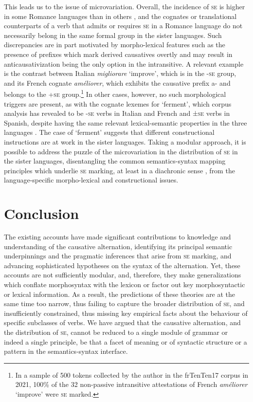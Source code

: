 \documentclass[output=paper,colorlinks,citecolor=brown
]{langscibook}
\begin{document}
This leads us to the issue of microvariation. Overall, the incidence of \textsc{se} is higher in some Romance languages than in others \citep{heidinger2015causalness}, and the cognates or translational counterparts of a verb that admits or requires \textsc{se} in a Romance language do not necessarily belong in the same formal group in the sister languages. Such discrepancies are in part motivated by morpho-lexical features such as the presence of prefixes which mark derived causatives overtly and may result in anticausativization being the only option in the intransitive. A relevant example is the contrast between Italian \textit{migliorare} ‘improve’, which is in the -\textsc{se} group, and its French cognate \textit{améliorer}, which exhibits the causative prefix a- and belongs to the +\textsc{se} group.\footnote{In a sample of 500 tokens collected by the author in the frTenTen17 corpus \citep{jakubicek2013tenten} in 2021, 100\% of the 32 non-passive intransitive attestations of French \textit{améliorer} ‘improve’ were \textsc{se} marked.}  In other cases, however, no such morphological triggers are present, as with the cognate lexemes for ‘ferment’, which corpus analysis has revealed to be -\textsc{se} verbs in Italian and French and ±\textsc{se} verbs in Spanish, despite having the same relevant lexical-semantic properties in the three languages \citep{bentley2023internally}. The case of ‘ferment’ suggests that different constructional instructions are at work in the sister languages. Taking a modular approach, it is possible to address the puzzle of the microvariation in the distribution of \textsc{se} in the sister languages, disentangling the common semantics-syntax mapping principles which underlie \textsc{se} marking, at least in a diachronic sense \citep{cennamo1995patterns}, from the language-specific morpho-lexical and constructional issues. 

\section{Conclusion}
\label{bentley_section_6}
The existing accounts have made significant contributions to knowledge and understanding of the causative alternation, identifying its principal semantic underpinnings and the pragmatic inferences that arise from \textsc{se} marking, and advancing sophisticated hypotheses on the syntax of the alternation. Yet, these accounts are not sufficiently modular, and, therefore, they make generalizations which conflate morphosyntax with the lexicon or factor out key morphosyntactic or lexical information.  As a result, the predictions of these theories are at the same time too narrow, thus failing to capture the broader distribution of \textsc{se}, and insufficiently constrained, thus missing key empirical facts about the behaviour of specific subclasses of verbs. We have argued that the causative alternation, and the distribution of \textsc{se}, cannot be reduced to a single module of grammar or indeed a single principle, be that a facet of meaning or of syntactic structure or a pattern in the semantics-syntax interface. 
\end{document}
